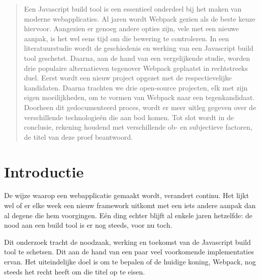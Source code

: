 \documentclass[a0,portrait]{a0poster}
\begin{document}
\begin{multicols}{2} %


\color{HoGentAccent1} %

\begin{abstract}
    Een Javascript build tool is een essentieel onderdeel bij het maken van moderne webapplicaties. Al jaren wordt Webpack gezien als de beste keuze hiervoor. Aangezien er genoeg andere opties zijn, vele met een nieuwe aanpak, is het wel eens tijd om die bewering te controleren. In een literatuurstudie wordt de geschiedenis en werking van een Javascript build tool geschetst. Daarna, aan de hand van een vergelijkende studie, worden drie populaire alternatieven tegenover Webpack geplaatst in rechtstreeks duel. Eerst wordt een nieuw project opgezet met de respectievelijke kandidaten. Daarna trachten we drie open-source projecten, elk met zijn eigen moeilijkheden, om te vormen van Webpack naar een tegenkandidaat. Doorheen dit gedocumenteerd proces, wordt er meer uitleg gegeven over de verschillende technologieën die aan bod komen. Tot slot wordt in de conclusie, rekening houdend met verschillende ob- en subjectieve factoren, de titel van deze proef beantwoord.
\end{abstract}

\color{HoGentAccent1} 
\section*{Introductie}
\color{black}
\color{black}
De wijze waarop een webapplicatie gemaakt wordt, verandert continu. Het lijkt wel of er elke week een nieuw framework uitkomt met een iets andere aanpak dan al degene die hem voorgingen. Eén ding echter blijft al enkele jaren hetzelfde: de nood aan een build tool is er nog steeds, voor nu toch.

Dit onderzoek tracht de noodzaak, werking en toekomst van de Javascript build tool te schetsen. Dit aan de hand van een paar veel voorkomende implementaties ervan. Het uiteindelijke doel is om te bepalen of de huidige koning, Webpack, nog steeds het recht heeft om die titel op te eisen.


\end{multicols}
\end{document}
